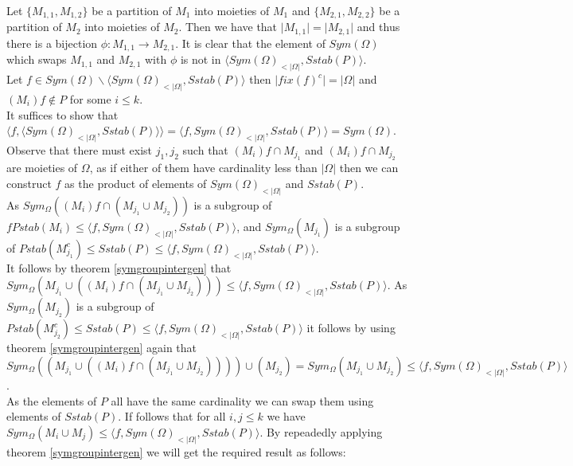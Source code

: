 \documentclass{report}
\begin{document}
Let $\{M_{1,1} , M_{1,2}\}$ be a partition of $M_1$ into moieties of $M_1$ and $\{M_{2,1},M_{2,2}\}$ be a partition of $M_2$ into moieties of $M_2$. Then we have that $\vert M_{1,1} \vert = \vert M_{2,1}\vert$ and thus there is a bijection $\phi:M_{1,1} \rightarrow M_{2,1}$. It is clear that the element of $Sym(\Omega)$ which swaps $M_{1,1}$ and $M_{2,1}$ with $\phi$ is not in $\langle Sym(\Omega)_{<\vert \Omega \vert},Sstab(P)\rangle$.\\
Let $f \in Sym(\Omega)\backslash \langle Sym(\Omega)_{<\vert \Omega \vert},Sstab(P)\rangle$ then $\vert fix(f)^c \vert = \vert \Omega \vert$ and $(M_i)f \notin P$ for some $i \leq k$.\\
It suffices to show that $\langle f, \langle Sym(\Omega)_{<\vert \Omega \vert},Sstab(P)\rangle \rangle=\langle f,  Sym(\Omega)_{<\vert \Omega \vert},Sstab(P) \rangle = Sym(\Omega)$.\\
Observe that there must exist $j_1,j_2$ such that $(M_i)f \cap M_{j_1}$ and $(M_i)f \cap M_{j_2}$ are moieties of $\Omega$, as if either of them have cardinality less than $\vert \Omega \vert$ then we can construct $f$ as the product of elements of $Sym(\Omega)_{<\vert \Omega \vert}$ and $Sstab(P)$.\\
As $Sym_{\Omega}((M_i)f \cap (M_{j_1}\cup M_{j_2}))$ is a subgroup of
 $fPstab(M_i) \leq \langle f,  Sym(\Omega)_{<\vert \Omega \vert},Sstab(P) \rangle$, and
  $Sym_{\Omega}(M_{j_1})$ is a subgroup of 
$Pstab(M_{j_1}^c) \leq Sstab(P) \leq \langle f,  Sym(\Omega)_{<\vert \Omega \vert},Sstab(P) \rangle$.\\
 It follows by theorem \ref{symgroupintergen} that $Sym_{\Omega}(M_{j_1}\cup ((M_i)f \cap (M_{j_1}\cup M_{j_2})))\leq \langle f,  Sym(\Omega)_{<\vert \Omega \vert},Sstab(P) \rangle$.
As $Sym_{\Omega}(M_{j_2})$ is a subgroup of 
$Pstab(M_{j_2}^c) \leq Sstab(P) \leq \langle f,  Sym(\Omega)_{<\vert \Omega \vert},Sstab(P) \rangle$ it follows by using theorem \ref{symgroupintergen} again that $Sym_{\Omega}((M_{j_1}\cup ((M_i)f \cap (M_{j_1}\cup M_{j_2}))))\cup(M_{j_2})=Sym_{\Omega}(M_{j_1}\cup M_{j_2}) \leq \langle f,  Sym(\Omega)_{<\vert \Omega \vert},Sstab(P) \rangle$.\\
As the elements of $P$ all have the same cardinality we can swap them using elements of $Sstab(P)$. If follows that for all $i,j \leq k$ we have $Sym_{\Omega}(M_{i}\cup M_{j}) \leq \langle f,  Sym(\Omega)_{<\vert \Omega \vert},Sstab(P) \rangle$. By repeadedly applying theorem \ref{symgroupintergen} we will get the required result as follows:
\end{document}

